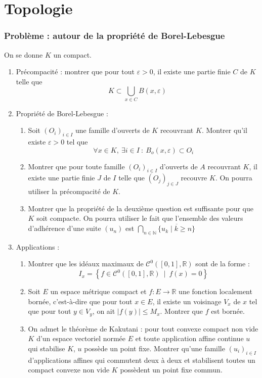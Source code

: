 \documentclass[french]{book}
\newcommand{\N}{\mathbb{N}}
\newcommand{\R}{\mathbb{R}}
\begin{document}
\chapter{Topologie}

\subsection{Problème : autour de la propriété de Borel-Lebesgue}
On se donne $K$ un compact.
\begin{enumerate}
	\item  Précompacité : montrer que pour tout $\varepsilon>0$, il existe une partie finie $C$ de $K$ telle que $$K\subset\bigcup_{x\in C}B(x,\varepsilon)$$
	\item Propriété de Borel-Lebesgue :
	\begin{enumerate}[label=\alph*.]
		\item Soit $(O_i)_{i\in I}$ une famille d'ouverts de $K$ recouvrant $K$. Montrer qu'il existe $\varepsilon>0$ tel que $$\forall x\in K,\ \exists i\in I\ : \ B_o(x,\varepsilon)\subset O_i$$
		\item Montrer que pour toute famille $(O_i)_{i\in I}$ d'ouverts de $A$ recouvrant $K$, il existe une partie finie $J$ de $I$ telle que $(O_j)_{j\in J}$ recouvre $K$. On pourra utiliser la précompacité de $K$.
		\item Montrer que la propriété de la deuxième question est suffisante pour que $K$ soit compacte. On pourra utiliser le fait que l'ensemble des valeurs d'adhérence d'une suite $(u_n)$ est $\displaystyle\bigcap_{n\in\N}\overline{\{u_k\mid k\geqslant n\}}$
	\end{enumerate}
	\item Applications :
	\begin{enumerate}[label=\alph*.]
		\item Montrer que les idéaux maximaux de $\mathcal{C}^0([0,1],\R)$ sont de la forme : $$I_x=\left\{f\in\mathcal{C}^0([0,1],\R)\ \mid\ f(x)=0\right\}$$
		\item Soit $E$ un espace métrique compact et $f:E\to\R$ une fonction localement bornée, c'est-à-dire que pour tout $x\in E$, il existe un voisinage $V_x$ de $x$ tel que pour tout $y\in V_y$, on ait $\lvert f(y)\rvert\leqslant M_x$. Montrer que $f$ est bornée.
		\item On admet le théorème de Kakutani : pour tout convexe compact non vide $K$ d'un espace vectoriel normée $E$ et toute application affine continue $u$ qui stabilise $K$, $u$ possède un point fixe. Montrer qu'une famille $(u_i)_{i\in I}$ d'applications affines qui commutent deux à deux et stabilisent toutes un compact convexe non vide $K$ possèdent un point fixe commun.
	\end{enumerate}
\end{enumerate}
\end{document}
